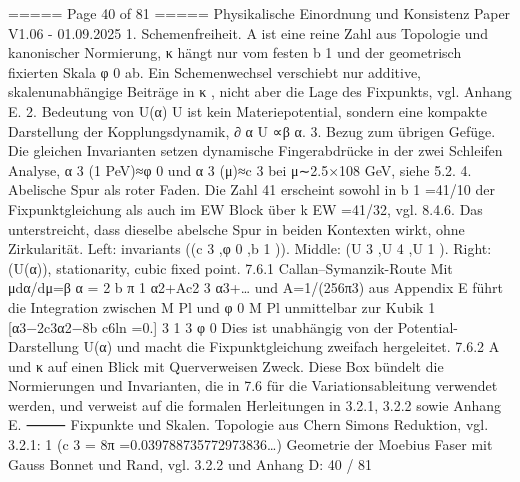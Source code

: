 \begin{MyVerbatim}
{===== Page 40 of 81 =====
Physikalische Einordnung und Konsistenz
Paper V1.06 - 01.09.2025
1. Schemenfreiheit. A ist eine reine Zahl aus Topologie und kanonischer Normierung, κ hängt nur vom festen b 1 und
der geometrisch fixierten Skala φ 0 ab. Ein Schemenwechsel verschiebt nur additive, skalenunabhängige Beiträge in κ
, nicht aber die Lage des Fixpunkts, vgl. Anhang E.
2. Bedeutung von U(α) U ist kein Materiepotential, sondern eine kompakte Darstellung der Kopplungsdynamik,
∂ α U ∝β α.
3. Bezug zum übrigen Gefüge. Die gleichen Invarianten setzen dynamische Fingerabdrücke in der zwei Schleifen
Analyse, α 3 (1 PeV)≈φ 0 und α 3 (μ)≈c 3 bei μ∼2.5×108 GeV, siehe 5.2.
4. Abelische Spur als roter Faden. Die Zahl 41 erscheint sowohl in b 1 =41/10 der Fixpunktgleichung als auch im EW
Block über k EW =41/32, vgl. 8.4.6. Das unterstreicht, dass dieselbe abelsche Spur in beiden Kontexten wirkt, ohne
Zirkularität.
Left: invariants ((c 3 ,φ 0 ,b 1 )). Middle: (U 3 ,U 4 ,U 1 ). Right: (U(α)), stationarity, cubic fixed point.
7.6.1 Callan–Symanzik-Route
Mit μdα/dμ=β α = 2 b π 1 α2+Ac2 3 α3+… und A=1/(256π3) aus Appendix E führt die Integration zwischen M Pl und
φ 0 M Pl unmittelbar zur Kubik
1
[α3−2c3α2−8b c6ln =0.]
3 1 3 φ
0
Dies ist unabhängig von der Potential-Darstellung U(α) und macht die Fixpunktgleichung zweifach hergeleitet.
7.6.2 A und κ auf einen Blick mit Querverweisen
Zweck. Diese Box bündelt die Normierungen und Invarianten, die in 7.6 für die Variationsableitung verwendet werden,
und verweist auf die formalen Herleitungen in 3.2.1, 3.2.2 sowie Anhang E.
⸻
Fixpunkte und Skalen.
Topologie aus Chern Simons Reduktion, vgl. 3.2.1:
1
(c
3
=
8π
=0.039788735772973836…)
Geometrie der Moebius Faser mit Gauss Bonnet und Rand, vgl. 3.2.2 und Anhang D:
40 / 81

}
\end{MyVerbatim}
